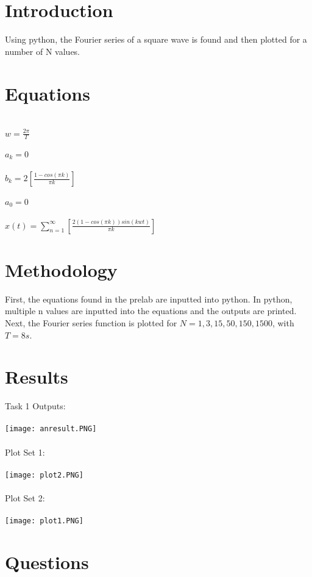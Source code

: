\documentclass[12pt]{report}
\begin{document}
\section{Introduction}
Using python, the Fourier series of a square wave is found and then plotted for a number of N values.

\section{Equations}
\\$w = \frac{2\pi}{T}$
\\
\\$a_k = 0$
\\
\\$b_k = 2[\frac{1-cos(\pi k)}{\pi k}]$
\\
\\$a_0 = 0$
\\
\\$x(t) = \sum_{n=1}^{\infty} [\frac{2(1-cos(\pi k))sin(kwt)}{\pi k}]$



\section{Methodology}
First, the equations found in the prelab are inputted into python. In python, multiple n values are inputted into the equations and the outputs are printed. Next, the Fourier series function is plotted for $N = {1,3,15,50,150,1500}$, with $T=8s$. 



\section{Results}
Task 1 Outputs:
\\
\\ \texttt{[image: anresult.PNG]}
\\
\\ Plot Set 1:
\\
\\ \texttt{[image: plot2.PNG]}
\\
\\ Plot Set 2:
\\
\\ \texttt{[image: plot1.PNG]}


\section{Questions}
\end{document}
